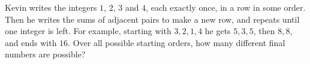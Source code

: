 Kevin writes the integers $1$, $2$, $3$ and $4$, each exactly once, in a row in some order. Then he writes the sums of adjacent pairs to make a new row, and repeats until one integer is left. For example, starting with $3,2,1,4$ he gets $5,3,5$, then $8,8$, and ends with $16$. Over all possible starting orders, how many different final numbers are possible?
